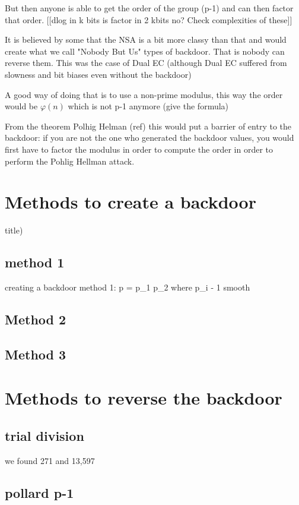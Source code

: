 \documentclass[a4paper,11pt]{article}
\begin{document}
{But then anyone is able to get the order of the group (p-1) and can then factor that order. [[dlog in k bits is factor in 2 kbits no? Check complexities of these]]

It is believed by some that the NSA is a bit more classy than that and would create what we call "Nobody But Us" types of backdoor. That is nobody can reverse them. This was the case of Dual EC (although Dual EC suffered from slowness and bit biases even without the backdoor)

A good way of doing that is to use a non-prime modulus, this way the order would be $\varphi(n)$ which is not p-1 anymore (give the formula)

From the theorem Polhig Helman (ref) this would put a barrier of entry to the backdoor: if you are not the one who generated the backdoor values, you would first have to factor the modulus in order to compute the order in order to perform the Pohlig Hellman attack.

\section{Methods to create a backdoor} title)}

\subsection{method 1}

creating a backdoor method 1: p = p_1 p_2 where p_i - 1 smooth

\subsection{Method 2}

\subsection{Method 3}

\section{Methods to reverse the backdoor}

\subsection{trial division}

we found 271 and 13,597

\subsection{pollard p-1}
\end{document}
